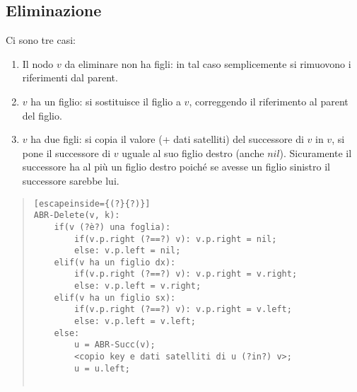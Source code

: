 \documentclass[a4paper,10pt]{article}
\theoremstyle{definition}
\begin{document}
\subsection{Eliminazione}
Ci sono tre casi:
\begin{enumerate}
 \item Il nodo $v$ da eliminare non ha figli: in tal caso semplicemente si rimuovono i riferimenti dal parent.
 \item $v$ ha un figlio: si sostituisce il figlio a $v$, correggendo il riferimento al parent del figlio.
 \item $v$ ha due figli: si copia il valore (+ dati satelliti) del successore di $v$ in $v$, si pone il successore di $v$ uguale al suo figlio destro (anche $nil$). Sicuramente il successore ha al più un figlio destro poiché se avesse un figlio sinistro il successore sarebbe lui.

\end{enumerate}

\begin{quote}
 \begin{lstlisting}[escapeinside={(?}{?)}]
ABR-Delete(v, k):
    if(v (?è?) una foglia):
        if(v.p.right (?==?) v): v.p.right = nil;
        else: v.p.left = nil;
    elif(v ha un figlio dx):
        if(v.p.right (?==?) v): v.p.right = v.right;
        else: v.p.left = v.right;
    elif(v ha un figlio sx):
        if(v.p.right (?==?) v): v.p.right = v.left;
        else: v.p.left = v.left;
    else:
        u = ABR-Succ(v);
        <copio key e dati satelliti di u (?in?) v>;
        u = u.left;
        
 \end{lstlisting}
\end{quote}
\end{document}

